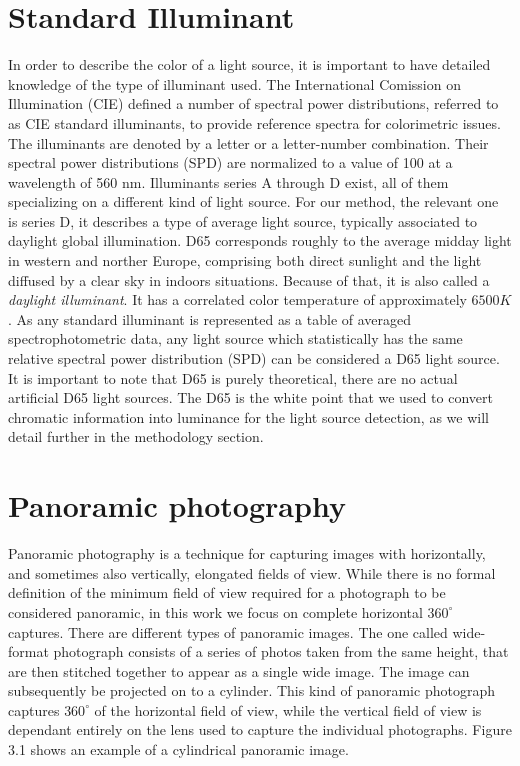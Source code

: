 \section{Standard Illuminant}
In order to describe the color of a light source, it is important to have detailed knowledge of the type of illuminant used. The International Comission on Illumination (CIE) defined a number of spectral power distributions, referred to as CIE standard illuminants, to provide reference spectra for colorimetric issues. The illuminants are denoted by a letter or a letter-number combination. Their spectral power distributions (SPD) are normalized to a value of 100 at a wavelength of 560 nm. Illuminants series A through D exist, all of them specializing on a different kind of light source. For our method, the relevant one is series D, it describes a type of average light source, typically associated to daylight global illumination.\newline
D65 corresponds roughly to the average midday light in western and norther Europe, comprising both direct sunlight and the light diffused by a clear sky in indoors situations. Because of that, it is also called a \emph{daylight illuminant}. It has a correlated color temperature of approximately $6500 K$. As any standard illuminant is represented as a table of averaged spectrophotometric data, any light source which statistically has the same relative spectral power distribution (SPD) can be considered a D65 light source. It is important to note that D65 is purely theoretical, there are no actual artificial D65 light sources. The D65 is the white point that we used to convert chromatic information into luminance for the light source detection, as we will detail further in the methodology section.

\section{Panoramic photography}
Panoramic photography is a technique for capturing images with horizontally, and sometimes also vertically, elongated fields of view. While there is no formal definition of the minimum field of view required for a photograph to be considered panoramic, in this work we focus on complete horizontal $360^{\circ}$ captures.\newline
There are different types of panoramic images. The one called wide-format photograph consists of a series of photos taken from the same height, that are then stitched together to appear as a single wide image. The image can subsequently be projected on to a cylinder. This kind of panoramic photograph captures $360^{\circ}$ of the horizontal field of view, while the vertical field of view is dependant entirely on the lens used to capture the individual photographs. Figure 3.1 shows an example of a cylindrical panoramic image. 

